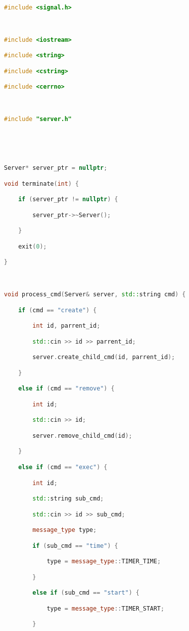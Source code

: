 \begin{lstlisting}[language=C++]

#include <signal.h>



#include <iostream>

#include <string>

#include <cstring>

#include <cerrno>



#include "server.h"





Server* server_ptr = nullptr;

void terminate(int) {

    if (server_ptr != nullptr) {

        server_ptr->~Server();

    }

    exit(0);

}



void process_cmd(Server& server, std::string cmd) {

    if (cmd == "create") {

        int id, parrent_id;

        std::cin >> id >> parrent_id;

        server.create_child_cmd(id, parrent_id);

    } 

    else if (cmd == "remove") {

        int id;

        std::cin >> id;

        server.remove_child_cmd(id);

    } 

    else if (cmd == "exec") {

        int id;

        std::string sub_cmd;

        std::cin >> id >> sub_cmd;

        message_type type;

        if (sub_cmd == "time") {

            type = message_type::TIMER_TIME;

        } 

        else if (sub_cmd == "start") {

            type = message_type::TIMER_START;

        } 


\end{lstlisting}
